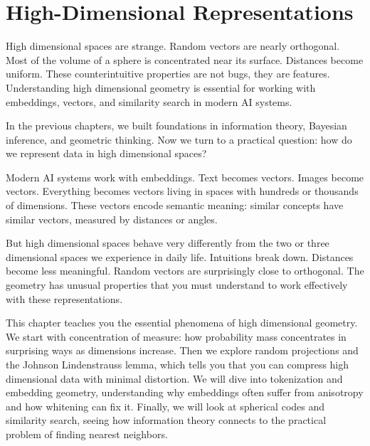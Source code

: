 
\chapter{High-Dimensional Representations}

\begin{keyinsight}
High dimensional spaces are strange. Random vectors are nearly orthogonal. Most of the volume of a sphere is concentrated near its surface. Distances become uniform. These counterintuitive properties are not bugs, they are features. Understanding high dimensional geometry is essential for working with embeddings, vectors, and similarity search in modern AI systems.
\end{keyinsight}

\vspace{1.5em}

In the previous chapters, we built foundations in information theory, Bayesian inference, and geometric thinking. Now we turn to a practical question: how do we represent data in high dimensional spaces?

Modern AI systems work with embeddings. Text becomes vectors. Images become vectors. Everything becomes vectors living in spaces with hundreds or thousands of dimensions. These vectors encode semantic meaning: similar concepts have similar vectors, measured by distances or angles.

But high dimensional spaces behave very differently from the two or three dimensional spaces we experience in daily life. Intuitions break down. Distances become less meaningful. Random vectors are surprisingly close to orthogonal. The geometry has unusual properties that you must understand to work effectively with these representations.

This chapter teaches you the essential phenomena of high dimensional geometry. We start with concentration of measure: how probability mass concentrates in surprising ways as dimensions increase. Then we explore random projections and the Johnson Lindenstrauss lemma, which tells you that you can compress high dimensional data with minimal distortion. We will dive into tokenization and embedding geometry, understanding why embeddings often suffer from anisotropy and how whitening can fix it. Finally, we will look at spherical codes and similarity search, seeing how information theory connects to the practical problem of finding nearest neighbors.

